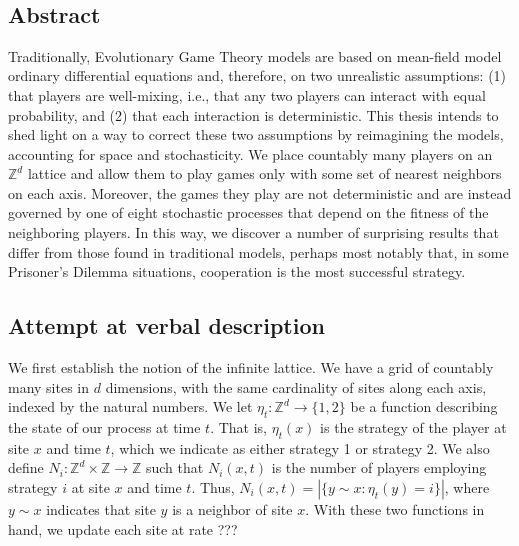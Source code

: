 \documentclass[notitlepage,reqno]{amsart}
\title{\huge{\textmd{\textbf{\hmwkClass\\\ \hmwkTitle}}}}
\date{}
\author{\textbf{\hmwkAuthor} \\
\textmd{\hmwkInstructor}}
\begin{document}
\thispagestyle{fancy}

\subsection*{Abstract}
Traditionally, Evolutionary Game Theory models are based on mean-field
model ordinary differential equations and, therefore, on two
unrealistic assumptions: (1) that players are well-mixing, i.e., that
any two players can interact with equal probability, and (2) that each
interaction is deterministic. This thesis intends to shed light on a
way to correct these two assumptions by reimagining the models,
accounting for space and stochasticity. We place countably many players on an
$\mathbb{Z}^d$ lattice and allow them to play games only with some set
of nearest neighbors on each axis. Moreover, the games they play are
not deterministic and are instead governed by one of eight stochastic
processes that depend on the fitness of the neighboring players. In
this way, we discover a number of surprising results that differ from
those found in traditional models, perhaps most notably that, in some
Prisoner's Dilemma situations, cooperation is the most successful strategy.

\subsection*{Attempt at verbal description}
We first establish the notion of the infinite lattice. We have a grid
of countably many sites in $d$ dimensions, with the same cardinality
of sites along each axis, indexed by the natural
numbers. We let $\eta_t:\mathbb{Z}^d\to \{1,2\}$ be a function describing the state
of our process at time $t$. That is, $\eta_t (x)$ is the strategy of
the player at site $x$ and time $t$, which we indicate as either
strategy 1 or strategy 2. We also define $N_i:\mathbb{Z}^d \times
\mathbb{Z}\to \mathbb{Z}$ such that $N_i(x,t)$ is the number of players
employing strategy $i$ at site $x$ and time $t$. Thus, $N_i(x,t) =
|\{y\sim x:\eta_t(y)=i\}|$, where $y\sim x$ indicates that site $y$ is
a neighbor of site $x$. With these two functions in hand, we update
each site at rate ???
\end{document}

